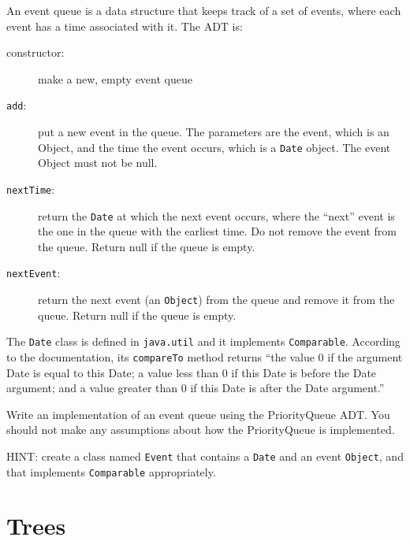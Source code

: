 \begin{exercise}
An event queue is a data structure that keeps track of a set
of events, where each event has a time associated with it.
The ADT is:

\begin{description}

\item[constructor:] make a new, empty event queue

\item[{\tt add}:] put a new event in the queue.  The parameters are
the event, which is an Object, and the time the event occurs, which
is a {\tt Date} object.  The event Object must not be null.

\item[{\tt nextTime}:] return the {\tt Date} at which the next event
occurs, where the ``next'' event is the one in the queue with the
earliest time.  Do not remove the event from the queue.  Return
null if the queue is empty.

\item[{\tt nextEvent}:] return the next event (an {\tt Object}) from
the queue and remove it from the queue.  Return null if the queue is
empty.


\end{description}

The {\tt Date} class is defined in {\tt java.util} and it implements
{\tt Comparable}.  According to the documentation, its {\tt compareTo}
method returns ``the value 0 if the argument Date is equal to this
Date; a value less than 0 if this Date is before the Date argument;
and a value greater than 0 if this Date is after the Date argument.''

Write an implementation of an event queue using the PriorityQueue
ADT.  You should not make any assumptions about how the PriorityQueue
is implemented.

HINT: create a class named {\tt Event} that contains a {\tt Date}
and an event {\tt Object}, and that implements {\tt Comparable}
appropriately.
\end{exercise}


\beforechapter
\chapter{Trees}
\label{chap17}

